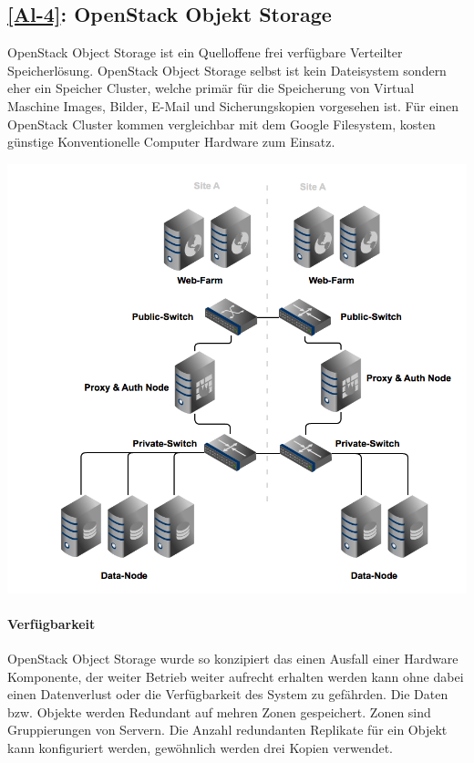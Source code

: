 \subsection{\ref{Al-4}: OpenStack Objekt Storage}
OpenStack Object Storage ist ein Quelloffene frei verfügbare Verteilter Speicherlösung. OpenStack Object Storage selbst ist kein Dateisystem sondern eher ein Speicher Cluster, welche primär für die Speicherung von Virtual Maschine Images, Bilder, E-Mail und Sicherungskopien vorgesehen ist. Für einen OpenStack Cluster kommen vergleichbar mit dem Google Filesystem, kosten günstige Konventionelle Computer Hardware zum Einsatz. 

\begin{center}
\includegraphics[width=\linewidth, keepaspectratio = true]{media/OpenStack.png}
\end{center}


\paragraph*{Verfügbarkeit}
OpenStack Object Storage wurde so konzipiert das einen Ausfall einer Hardware Komponente, der weiter Betrieb weiter aufrecht erhalten werden kann ohne dabei einen Datenverlust oder die Verfügbarkeit des System zu gefährden. Die Daten bzw. Objekte werden Redundant auf mehren Zonen gespeichert. Zonen sind Gruppierungen von Servern. Die Anzahl redundanten Replikate für ein Objekt kann konfiguriert werden, gewöhnlich werden drei Kopien verwendet.

